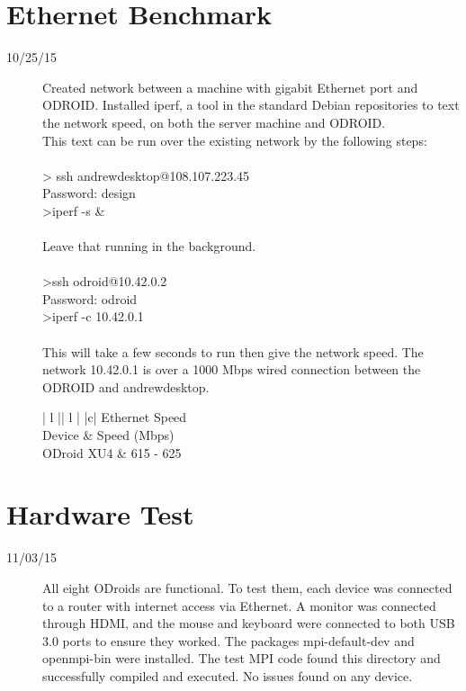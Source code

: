 \section{Ethernet Benchmark}
\begin{description}
\item [10/25/15] Created network between a machine with gigabit Ethernet port and ODROID. Installed iperf, a tool in the standard Debian repositories to text the network speed, on both the server machine and ODROID. \\

This text can be run over the existing network by the following steps: \\ \\
> ssh andrewdesktop@108.107.223.45 \\
Password: design \\
>iperf -s \& \\ \\
Leave that running in the background. \\ \\
>ssh odroid@10.42.0.2 \\
Password: odroid \\
>iperf -c 10.42.0.1 \\ \\
This will take a few seconds to run then give the network speed. The network 10.42.0.1 is over a 1000 Mbps wired connection between the ODROID and andrewdesktop. \\

\begin{center}
\begin{tabular}{ | l || l | }
\hline
{}
{ |c| }{ Ethernet Speed } \\
\hline
Device & Speed (Mbps) \\
\hline
ODroid XU4 & 615 - 625 \\
\hline
\end{tabular}
\end{center}

\end{description}

\section{Hardware Test}
\begin{description}
\item [11/03/15] All eight ODroids are functional. To test them, each device was connected to a router with internet access via Ethernet. A monitor was connected through HDMI, and the mouse and keyboard were connected to both USB 3.0 ports to ensure they worked. The packages mpi-default-dev and openmpi-bin were installed. The test MPI code found this directory and successfully compiled and executed. No issues found on any device. \\
\end{description}

